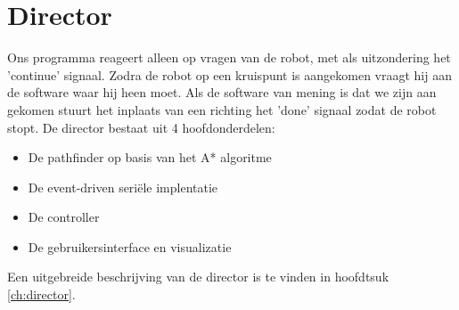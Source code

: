 \documentclass{report}
\begin{document}
\section{Director}
Ons programma reageert alleen op vragen van de robot, met als uitzondering het 'continue' signaal. Zodra de robot op een kruispunt is aangekomen vraagt hij aan de software waar hij heen moet. Als de software van mening is dat we zijn aan gekomen stuurt het inplaats van een richting het 'done' signaal zodat de robot stopt. De director bestaat uit 4 hoofdonderdelen:
\begin{itemize}
\item De pathfinder op basis van het A* algoritme
\item De event-driven seriële implentatie
\item De controller
\item De gebruikersinterface en visualizatie
\end{itemize}
Een uitgebreide beschrijving van de director is te vinden in hoofdtsuk \ref{ch:director}.

\end{document}
